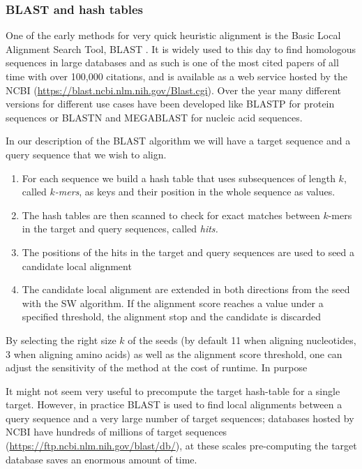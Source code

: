 \documentclass[
  11pt,
  twoside]{scrbook}
\providecommand{\tightlist}{%
  \setlength{\itemsep}{0pt}\setlength{\parskip}{0pt}}
\begin{document}
\hypertarget{blast-and-hash-tables}{%
\subsubsection{BLAST and hash tables}\label{blast-and-hash-tables}}

One of the early methods for very quick heuristic alignment is the Basic Local Alignment Search Tool, BLAST \autocite{altschulBasicLocalAlignment1990}. It is widely used to this day to find homologous sequences in large databases and as such is one of the most cited papers of all time with over 100,000 citations, and is available as a web service hosted by the NCBI (\url{https://blast.ncbi.nlm.nih.gov/Blast.cgi}). Over the year many different versions for different use cases have been developed like BLASTP for protein sequences or BLASTN and MEGABLAST for nucleic acid sequences.

In our description of the BLAST algorithm we will have a target sequence and a query sequence that we wish to align.

\begin{enumerate}
\def\labelenumi{\arabic{enumi}.}
\tightlist
\item
  For each sequence we build a hash table that uses subsequences of length \(k\), called \(k\)\emph{-mers}, as keys and their position in the whole sequence as values.
\item
  The hash tables are then scanned to check for exact matches between \(k\)-mers in the target and query sequences, called \emph{hits.}
\item
  The positions of the hits in the target and query sequences are used to seed a candidate local alignment
\item
  The candidate local alignment are extended in both directions from the seed with the SW algorithm. If the alignment score reaches a value under a specified threshold, the alignment stop and the candidate is discarded
\end{enumerate}

By selecting the right size \(k\) of the seeds (by default 11 when aligning nucleotides, 3 when aligning amino acids) as well as the alignment score threshold, one can adjust the sensitivity of the method at the cost of runtime. In purpose

It might not seem very useful to precompute the target hash-table for a single target. However, in practice BLAST is used to find local alignments between a query sequence and a very large number of target sequences; databases hosted by NCBI have hundreds of millions of target sequences (\url{https://ftp.ncbi.nlm.nih.gov/blast/db/}), at these scales pre-computing the target database saves an enormous amount of time.
\end{document}

